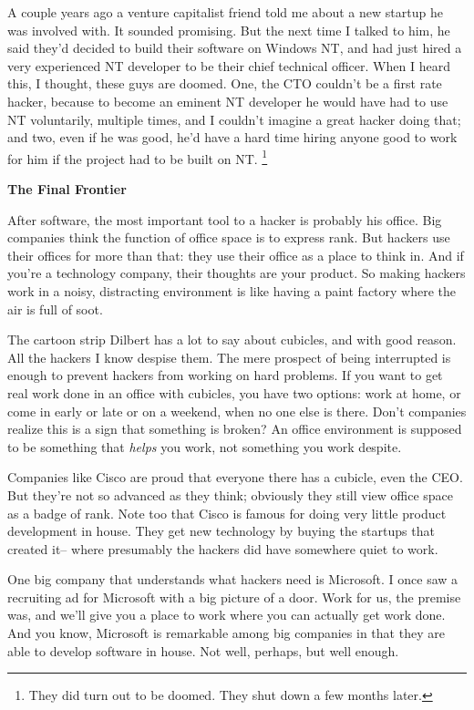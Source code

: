 A couple years ago a venture capitalist friend told me about a new
startup he was involved with. It sounded promising. But the next time I
talked to him, he said they'd decided to build their software on Windows
NT, and had just hired a very experienced NT developer to be their chief
technical officer. When I heard this, I thought, these guys are doomed.
One, the CTO couldn't be a first rate hacker, because to become an
eminent NT developer he would have had to use NT voluntarily, multiple
times, and I couldn't imagine a great hacker doing that; and two, even
if he was good, he'd have a hard time hiring anyone good to work for him
if the project had to be built on NT. \footnote{They did turn out to be doomed. They shut down a few months
later.}

\textbf{The Final Frontier}

After software, the most important tool to a hacker is probably his
office. Big companies think the function of office space is to express
rank. But hackers use their offices for more than that: they use their
office as a place to think in. And if you're a technology company, their
thoughts are your product. So making hackers work in a noisy,
distracting environment is like having a paint factory where the air is
full of soot.

The cartoon strip Dilbert has a lot to say about cubicles, and with good
reason. All the hackers I know despise them. The mere prospect of being
interrupted is enough to prevent hackers from working on hard problems.
If you want to get real work done in an office with cubicles, you have
two options: work at home, or come in early or late or on a weekend,
when no one else is there. Don't companies realize this is a sign that
something is broken? An office environment is supposed to be something
that \emph{helps} you work, not something you work despite.

Companies like Cisco are proud that everyone there has a cubicle, even
the CEO. But they're not so advanced as they think; obviously they still
view office space as a badge of rank. Note too that Cisco is famous for
doing very little product development in house. They get new technology
by buying the startups that created it-- where presumably the hackers
did have somewhere quiet to work.

One big company that understands what hackers need is Microsoft. I once
saw a recruiting ad for Microsoft with a big picture of a door. Work for
us, the premise was, and we'll give you a place to work where you can
actually get work done. And you know, Microsoft is remarkable among big
companies in that they are able to develop software in house. Not well,
perhaps, but well enough.


